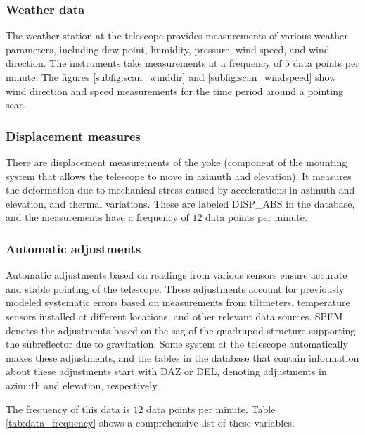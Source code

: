 \subsubsection{Weather data}
The weather station at the telescope provides measurements of various weather parameters, including dew point, humidity, pressure, wind speed, and wind direction.
The instruments take measurements at a frequency of $5$ data points per minute.
The figures \ref{subfig:scan_winddir} and \ref{subfig:scan_windspeed} show wind direction and speed measurements for the time period around a pointing scan.


\subsubsection{Displacement measures}
There are displacement measurements of the yoke (component of the mounting system that allows the telescope to move in azimuth and elevation).
It measures the deformation due to mechanical stress caused by accelerations in azimuth and elevation, and thermal variations.
These are labeled DISP\_ABS in the database, and the measurements have a frequency of $12$ data points per minute.

\subsubsection{Automatic adjustments}
Automatic adjustments based on readings from various sensors ensure accurate and stable pointing of the telescope.
These adjustments account for previously modeled systematic errors based on measurements from tiltmeters, temperature sensors installed at different locations, and other relevant data sources.
SPEM denotes the adjustments based on the sag of the quadrupod structure supporting the subreflector due to gravitation.
Some system at the telescope automatically makes these adjustments, and the tables in the database that contain information about these adjustments start with DAZ or DEL, denoting adjustments in azimuth and elevation, respectively.

The frequency of this data is $12$ data points per minute.
Table \ref{tab:data_frequency} shows a comprehensive list of these variables.


